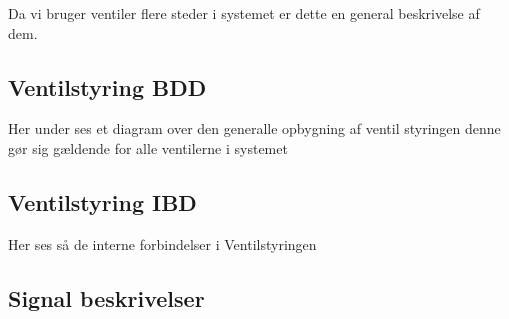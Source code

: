 
Da vi bruger ventiler flere steder i systemet er dette en general beskrivelse af dem.

\subsection{Ventilstyring BDD}
Her under ses et diagram over den generalle opbygning af ventil styringen denne gør sig gældende for alle ventilerne i systemet


\subsection{Ventilstyring IBD}
Her ses så de interne forbindelser i Ventilstyringen 


\subsection{Signal beskrivelser}

